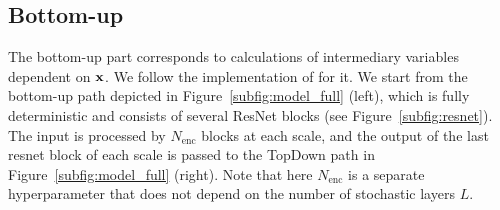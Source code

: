  \subsection{Bottom-up} \label{subsec:arch_encoder}
The bottom-up part corresponds to calculations of intermediary variables dependent on ${\mathbf{x}}$. We follow the implementation of \citet{Child2020-ze} for it. We start from the bottom-up path depicted in Figure~\ref{subfig:model_full} (left), which is fully deterministic and consists of several ResNet blocks (see Figure~\ref{subfig:resnet}). 
The input is processed by $N_{\text{enc}}$ blocks at each scale, and the output of the last resnet block of each scale is passed to the TopDown path in Figure~\ref{subfig:model_full} (right). Note that here $N_{\text{enc}}$ is a separate hyperparameter that does not depend on the number of stochastic layers $L$.


